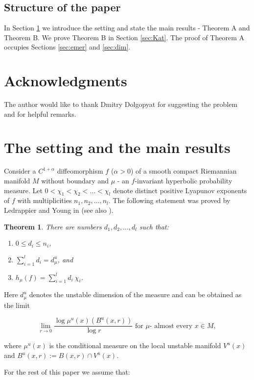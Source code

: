 \documentclass{amsart}
\theoremstyle{plain}
\newtheorem{thm}{Theorem}[section]
\theoremstyle{definition}
\theoremstyle{remark}
\numberwithin{equation}{section}
\begin{document}
\subsection{Structure of the paper}
In Section \ref{sec:setting} we introduce the setting and state the main results - Theorem A and Theorem B. 
We prove Theorem B in Section \ref{sec:Kat}. The proof of Theorem A occupies Sections \ref{sec:emer} and \ref{sec:dim}.


\section*{Acknowledgments}
The author would like to thank Dmitry Dolgopyat for suggesting the problem and for helpful remarks.




\section{The setting and the main results}\label{sec:setting} 


Consider a $C^{1+\alpha}$ diffeomorphism $f$ ($\alpha>0$) of a smooth compact Riemannian manifold $M$ without boundary and $\mu$ - an $f$-invariant hyperbolic probability measure.
Let $0 < \chi_1<\chi_2<\ldots<\chi_l$ denote distinct positive Lyapunov exponents of $f$ with multiplicities $n_1, n_2, \ldots, n_l$.
The following statement was proved by Ledrappier and Young in \cite{LY} (see also \cite[Theorem 14.1.18]{pesRed}).

\begin{thm}\label{thm:LY}
There are numbers $d_1, d_2, \ldots, d_l$ such that:
\begin{enumerate}
\item $0\leq d_i\leq n_i$,
\item $\sum_{i=1}^l d_i = d_{\mu}^u$, and
\item $h_{\mu}(f)= \sum_{i=1}^l  d_i ~ \chi_i$.
\end{enumerate}
\end{thm}
Here $ d_{\mu}^u$ denotes the unstable dimension of the measure and can be obtained \cite[Theorem 14.1.6]{pesRed} as the limit

$$  \lim_{r\to 0} \frac{\log \mu^u(x)(B^u(x,r))}{\log r}   \text{ for $\mu$- almost every }x\in M,$$

where $ \mu^u(x)$ is the conditional measure on the local unstable manifold $V^u(x)$ and $B^u(x,r):= B(x,r)\cap V^u(x).$


For the rest of this paper we assume that: %
\end{document}
